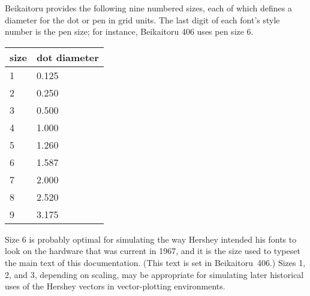 \documentclass{article}
\begin{document}
Beikaitoru provides the following nine numbered sizes, each of which defines
a diameter for the dot or pen in grid units.  The last digit of
each font's style number is the pen size; for instance, Beikaitoru 406 uses
pen size 6.

\begin{tabular}{ll}
  size & dot diameter \\ \hline
  1 & 0.125 \\
  2 & 0.250 \\
  3 & 0.500 \\
  4 & 1.000 \\
  5 & 1.260 \\
  6 & 1.587 \\
  7 & 2.000 \\
  8 & 2.520 \\
  9 & 3.175
\end{tabular}

Size 6 is probably optimal for simulating the way Hershey intended his fonts
to look on the hardware that was current in 1967, and it is the size used to
typeset the main text of this documentation.  (This text is set in
Beikaitoru~406.)  Sizes 1, 2, and 3, depending
on scaling, may be appropriate for simulating later historical uses of the
Hershey vectors in vector-plotting environments.
\end{document}
